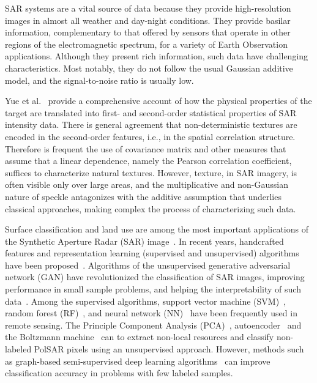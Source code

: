 \documentclass[journal]{IEEEtran}
\begin{document}
SAR systems are a vital source of data because they provide high-resolution images in almost all weather and day-night conditions.
They provide basilar information, complementary to that offered by sensors that operate in other regions of the electromagnetic spectrum, for a variety of Earth Observation applications.	
Although they present rich information, such data have challenging characteristics.
Most notably, they do not follow the usual Gaussian additive model, and the signal-to-noise ratio is usually low.

Yue et al.~\cite{Yue2020Gaussian} provide a comprehensive account of how the physical properties of the target are translated into first- and second-order statistical properties of SAR intensity data.
There is general agreement that non-deterministic textures are encoded in the second-order features, i.e., in the spatial correlation structure.
Therefore is frequent the use of covariance matrix and other measures that assume that a linear dependence, namely the Pearson correlation coefficient, suffices to characterize natural textures.
However, texture, in SAR imagery, is often visible only over large areas, and the multiplicative and non-Gaussian nature of speckle antagonizes with the additive assumption that underlies classical approaches, making complex the process of characterizing such data.

Surface classification and land use are among the most important applications of the Synthetic Aperture Radar (SAR) image~\cite{Pottier2004Unsupervised}.
In recent years, handcrafted features and representation learning (supervised and unsupervised) algorithms have been proposed~\cite{han2020unsupervised, huang2020classification, xie2020polsar}.
Algorithms of the unsupervised generative adversarial network (GAN) have revolutionized the classification of SAR images, improving performance in small sample problems, and helping the interpretability of such data~\cite{liu2019task}.
Among the supervised algorithms, support vector machine (SVM)~\cite{sukawattanavijit2017ga}, random forest (RF)~\cite{mcnairn2014early}, and neural network (NN)~\cite{lin2017deep} have been frequently used in remote sensing.
The Principle Component Analysis (PCA)~\cite{ressel2015neural}, autoencoder~\cite{wang2019classification} and the Boltzmann machine~\cite{qin2017object} can to extract non-local resources and classify non-labeled PolSAR pixels using an unsupervised approach.
However, methods such as graph-based semi-supervised deep learning algorithms~\cite{bi2018graph} can improve classification accuracy in problems with few labeled samples.
\end{document}
